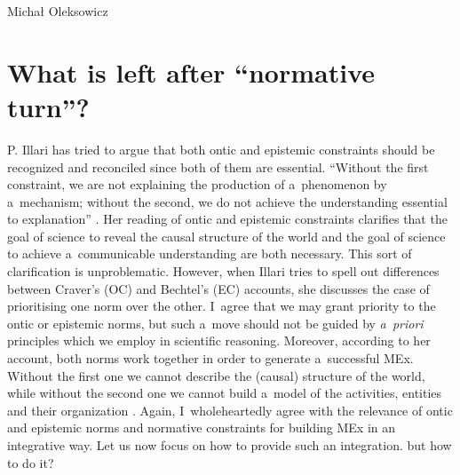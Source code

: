 \begin{artengenv}{Michał Oleksowicz}
\section{What is left after ``normative turn''?}
P. Illari
\parencite*[][pp.248–252]{illari_mechanistic_2013} %
 has tried to argue that both ontic and epistemic constraints should be recognized and reconciled since both of them are essential. ``Without the first constraint, we are not explaining the production of a~phenomenon by a~mechanism; without the second, we do not achieve the understanding essential to explanation'' 
\parencite[][p.250]{illari_mechanistic_2013}. %
 Her reading of ontic and epistemic constraints clarifies that the goal of science to reveal the causal structure of the world and the goal of science to achieve a~communicable understanding are both necessary. This sort of clarification is unproblematic. However, when Illari tries to spell out differences between Craver's (OC) and Bechtel's (EC) accounts, she discusses the case of prioritising one norm over the other. I~agree that we may grant priority to the ontic or epistemic norms, but such a~move should not be guided by \textit{a~priori} principles which we employ in scientific reasoning. Moreover, according to her account, both norms work together in order to generate a~successful MEx. Without the first one we cannot describe the (causal) structure of the world, while without the second one we cannot build a~model of the activities, entities and their organization 
\parencite[][p.250]{illari_mechanistic_2013}. %
 Again, I~wholeheartedly agree with the relevance of ontic and epistemic norms and normative constraints for building MEx in an integrative way. Let us now focus on how to provide such an integration. but how to do it?


\end{artengenv}
